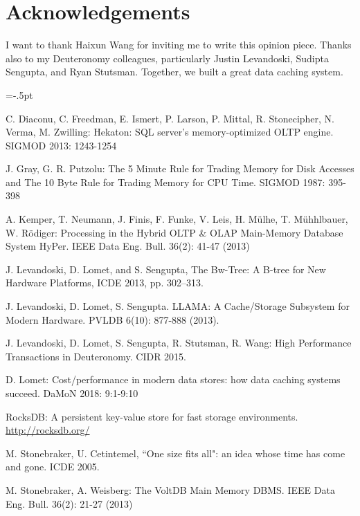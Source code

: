 \documentclass[11pt]{article}
\begin{document}
\vspace{-.1cm}
\section{Acknowledgements}
I want to thank Haixun Wang for inviting me to write this opinion piece.  Thanks also to my Deuteronomy colleagues, particularly Justin Levandoski, Sudipta Sengupta, and Ryan Stutsman.  Together, we built a great data caching system.

\vspace{-.1cm}

\begin{thebibliography}{10}
\begin{small}



\itemsep=-.5pt


C. Diaconu, C. Freedman, E. Ismert, P. Larson, P. Mittal, R. Stonecipher, N. Verma, M. Zwilling:
Hekaton: SQL server's memory-optimized OLTP engine. SIGMOD 2013: 1243-1254



J. Gray, G. R. Putzolu:
The 5 Minute Rule for Trading Memory for Disk Accesses and The 10 Byte Rule for Trading Memory for CPU Time. SIGMOD 1987: 395-398


A. Kemper, T. Neumann, J. Finis, F. Funke, V. Leis, H. M\"{u}lhe, T. M\"{u}hhlbauer, W. R\"{o}diger:
Processing in the Hybrid OLTP \& OLAP Main-Memory Database System HyPer. IEEE Data Eng. Bull. 36(2): 41-47 (2013)


J. Levandoski, D. Lomet, and S. Sengupta,
The Bw-Tree: A B-tree for New Hardware Platforms,
ICDE 2013, pp. 302--313.

J. Levandoski, D. Lomet, S. Sengupta.
LLAMA: A Cache/Storage Subsystem for Modern Hardware.
PVLDB 6(10): 877-888 (2013).

J. Levandoski, D. Lomet, S. Sengupta, R. Stutsman, R. Wang:
High Performance Transactions in Deuteronomy.
CIDR 2015.

D. Lomet: Cost/performance in modern data stores: how data caching systems succeed. DaMoN 2018: 9:1-9:10

RocksDB: A persistent key-value store for fast storage environments.
\url{http://rocksdb.org/}

M. Stonebraker, U. Cetintemel, ``One size fits all": an idea whose time has come and gone. ICDE 2005.


M. Stonebraker, A. Weisberg:
The VoltDB Main Memory DBMS. IEEE Data Eng. Bull. 36(2): 21-27 (2013)



\end{small}
\end{thebibliography}
\end{document}
